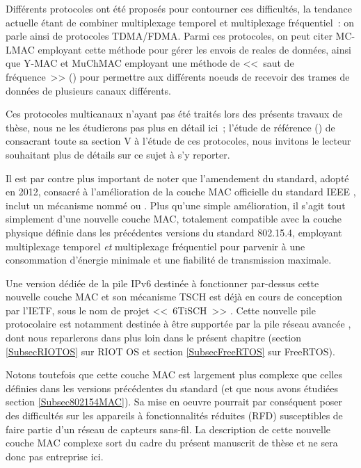 Différents protocoles ont été proposés pour contourner ces difficultés,
la tendance actuelle étant de combiner multiplexage temporel et multiplexage
fréquentiel~: on parle ainsi de protocoles TDMA/FDMA. Parmi ces protocoles,
on peut citer MC-LMAC employant cette méthode pour gérer les envois de
reales de données, ainsi que Y-MAC et MuChMAC employant une méthode
de <<~saut de fréquence~>> () pour permettre
aux différents noeuds de recevoir des trames de données de plusieurs
canaux différents.

Ces protocoles multicanaux n'ayant pas été traités lors des présents
travaux de thèse, nous ne les étudierons pas plus en détail ici~;
l'étude de référence () de
\cite{Evolution-MAC-WSN-Survey-2013} consacrant toute sa section V
à l'étude de ces protocoles, nous invitons le lecteur souhaitant plus
de détails sur ce sujet à s'y reporter.

Il est par contre plus important de noter que l'amendement 
du standard, adopté en 2012, consacré à l'amélioration de la couche MAC
officielle du standard IEEE \cite{IEEE802154e-2012}, inclut un mécanisme
nommé  ou . Plus qu'une
simple amélioration, il s'agit tout simplement d'une nouvelle couche MAC,
totalement compatible avec la couche physique définie dans les précédentes
versions du standard 802.15.4, employant multiplexage temporel \emph{et}
multiplexage fréquentiel pour parvenir à une consommation d'énergie
minimale et une fiabilité de transmission maximale.

Une version dédiée de la pile IPv6 destinée à fonctionner par-dessus cette
nouvelle couche MAC et son mécanisme TSCH est déjà en cours de conception
par l'IETF, sous le nom de projet <<~6TiSCH~>> \cite{6TiSCH}. Cette nouvelle
pile protocolaire est notamment destinée à être supportée par la pile
réseau avancée  \cite{OpenWSN}, dont nous reparlerons
dans plus loin dans le présent chapitre (section \vref{SubsecRIOTOS}
sur RIOT OS et section \vref{SubsecFreeRTOS} sur FreeRTOS).

Notons toutefois que cette couche MAC est largement plus complexe que celles
définies dans les versions précédentes du standard (et que nous avons
étudiées section \vref{Subsec802154MAC}). Sa mise en oeuvre pourrait
par conséquent poser des difficultés sur les appareils à fonctionnalités
réduites (RFD) susceptibles de faire partie d'un réseau de capteurs sans-fil.
La description de cette nouvelle couche MAC complexe sort du cadre du
présent manuscrit de thèse et ne sera donc pas entreprise ici.

